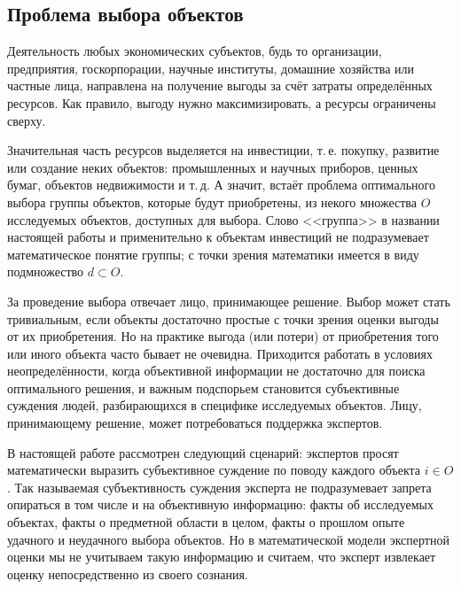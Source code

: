 
\subsection{Проблема выбора объектов}

Деятельность любых экономических субъектов, будь то организации, предприятия, госкорпорации, научные институты, домашние хозяйства или частные лица, направлена на получение выгоды за счёт затраты определённых ресурсов. Как правило, выгоду нужно максимизировать, а ресурсы ограничены сверху. 

Значительная часть ресурсов выделяется на инвестиции, т.\,е. покупку, развитие или создание неких объектов: промышленных и научных приборов, ценных бумаг, объектов недвижимости и т.\,д. А значит, встаёт проблема оптимального выбора группы объектов, которые будут приобретены, из некого множества $O$ исследуемых объектов, доступных для выбора. Слово <<группа>> в названии настоящей работы и применительно к объектам инвестиций не подразумевает  математическое понятие группы; с точки зрения математики имеется в виду подмножество $d \subset O$. 

За проведение выбора отвечает лицо, принимающее решение. Выбор может стать тривиальным, если объекты достаточно простые с точки зрения оценки выгоды от их приобретения. Но на практике выгода (или потери) от приобретения того или иного объекта часто бывает не очевидна. Приходится работать в условиях неопределённости, когда объективной информации не достаточно для поиска оптимального решения, и важным подспорьем становится субъективные суждения людей, разбирающихся в специфике исследуемых объектов. Лицу, принимающему решение, может потребоваться поддержка экспертов. 

В настоящей работе рассмотрен следующий сценарий: экспертов просят математически выразить субъективное суждение по поводу каждого объекта $i \in O$. Так называемая субъективность суждения эксперта не подразумевает запрета опираться в том числе и на объективную информацию: факты об исследуемых объектах, факты о предметной области в целом, факты о прошлом опыте удачного и неудачного выбора объектов. Но в математической модели экспертной оценки мы не учитываем такую информацию и считаем, что эксперт извлекает оценку непосредственно из своего сознания. 

